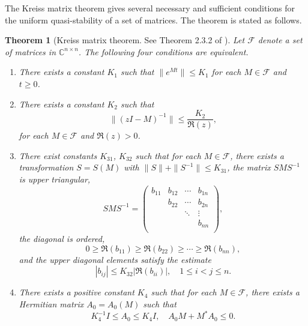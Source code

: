 \documentclass{article}
\theoremstyle{plain}%
\newtheorem{theorem}{Theorem}%
\theoremstyle{definition}%
\theoremstyle{remark}%
\newcommand{\bC}{\mathbb{C}}
\newcommand{\cF}{\mathcal{F}}
\newcommand{\+}[1]{{\bm{#1}}}
\newcommand{\norm}[1]{\|{#1}\|}
\begin{document}
The Kreiss matrix theorem gives several 
necessary and sufficient conditions for the uniform quasi-stability 
of a set of matrices. The theorem is stated as follows.
\begin{theorem}[Kreiss matrix theorem. See Theorem 2.3.2 of 
  \cite{kreiss_initial-boundary_2004}]
  \label{thm:KMT}
  Let $\cF$ denote a set of matrices in $\bC^{n \times n}$.
  The following four conditions are equivalent.
  \begin{enumerate}
    \item There exists a constant $K_1$ such that  
      $\norm{e^{M t}} \le K_1$ for each $M \in \cF$ and 
      $t \ge 0$.
    \item There exists a constant $K_2$ such that 
      \begin{displaymath}
        \norm{(z I - M)^{-1}} \le \frac{K_2}{\Re(z)}, 
      \end{displaymath}
      for each $M \in \cF$ and $\Re(z) > 0$.
    \item There exist constants $K_{31}$, $K_{32}$ such that 
      for each $M \in \cF$, there exists a 
      transformation $S = S(M)$ with 
      $\norm{S} + \norm{S^{-1}} \le K_{31}$,
      the matrix $S M S^{-1}$ is upper triangular,
      \begin{displaymath}
        S M S^{-1} = \begin{pmatrix}
          b_{11} & b_{12} & \cdots & b_{1n} \\
               & b_{22} & \cdots & b_{2n} \\
               &    & \ddots & \vdots \\
               &    &    & b_{nn} \\
        \end{pmatrix},
      \end{displaymath}
      the diagonal is ordered, 
      \begin{displaymath}
        0 \ge \Re(b_{11}) \ge \Re(b_{22}) \ge \cdots \ge 
        \Re(b_{nn}),
      \end{displaymath}
      and the upper diagonal elements satisfy the estimate 
      \begin{displaymath}
        |b_{ij}| \le K_{32} |\Re(b_{ii})|, \quad 
          1 \le i < j \le n.
      \end{displaymath}
    \item There exists a positive constant $K_4$ such that 
      for each $M \in \cF$, there exists a Hermitian 
      matrix $A_0 = A_0(M)$ such that 
      \begin{displaymath}
        K_4^{-1} I \le A_0 \le K_4 I, \quad A_0 M + M^* A_0 \le 0.
      \end{displaymath}
  \end{enumerate}
\end{theorem}
\end{document}
